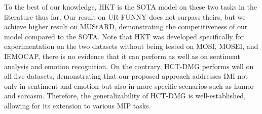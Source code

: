 \documentclass[11pt,a4paper]{article}
\begin{document}
\begin{table}[!ht]
\centering
\caption{Comparison results on UR-FUNNY and MUStARD for humor and sarcasm detection. \\ $^{\dag}$: models using feature from LPM.}
\label{urfunny}
\end{table}

To the best of our knowledge, HKT is the SOTA model on these two tasks in the literature thus far. Our result on UR-FUNNY does not surpass theirs, but we achieve higher result on MUStARD, demonstrating the competitiveness of our model compared to the SOTA. Note that HKT was developed specifically for experimentation on the two datasets without being tested on MOSI, MOSEI, and IEMOCAP, there is no evidence that it can perform as well as on sentiment analysis and emotion recognition. On the contrary, HCT-DMG performs well on all five datasets, demonstrating that our proposed approach addresses IMI not only in sentiment and emotion but also in more specific scenarios such as humor and sarcasm. Therefore, the generalizability of HCT-DMG is well-established, allowing for its extension to various MIP tasks.
\end{document}
